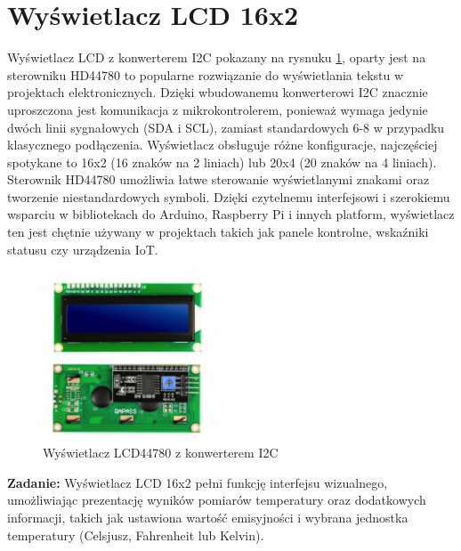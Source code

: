\section{Wyświetlacz LCD 16x2}

Wyświetlacz LCD z konwerterem I2C pokazany na rysnuku \ref{fig:lcd}, oparty jest na sterowniku HD44780 to popularne rozwiązanie do wyświetlania tekstu w projektach elektronicznych. Dzięki wbudowanemu konwerterowi I2C znacznie uproszczona jest komunikacja z mikrokontrolerem, ponieważ wymaga jedynie dwóch linii sygnałowych (SDA i SCL), zamiast standardowych 6-8 w przypadku klasycznego podłączenia. Wyświetlacz obsługuje różne konfiguracje, najczęściej spotykane to 16x2 (16 znaków na 2 liniach) lub 20x4 (20 znaków na 4 liniach). Sterownik HD44780 umożliwia łatwe sterowanie wyświetlanymi znakami oraz tworzenie niestandardowych symboli. Dzięki czytelnemu interfejsowi i szerokiemu wsparciu w bibliotekach do Arduino, Raspberry Pi i innych platform, wyświetlacz ten jest chętnie używany w projektach takich jak panele kontrolne, wskaźniki statusu czy urządzenia IoT.

\begin{figure}[h!]
        \centering
        \includegraphics[width=0.45\textwidth]{images/lcd.png}
        \caption{Wyświetlacz LCD44780 z konwerterem I2C}
        \label{fig:lcd}
    \end{figure}

\textbf{Zadanie:} Wyświetlacz LCD 16x2 pełni funkcję interfejsu wizualnego, umożliwiając prezentację wyników pomiarów temperatury oraz dodatkowych informacji, takich jak ustawiona wartość emisyjności i wybrana jednostka temperatury (Celsjusz, Fahrenheit lub Kelvin).

\vspace{12pt}


